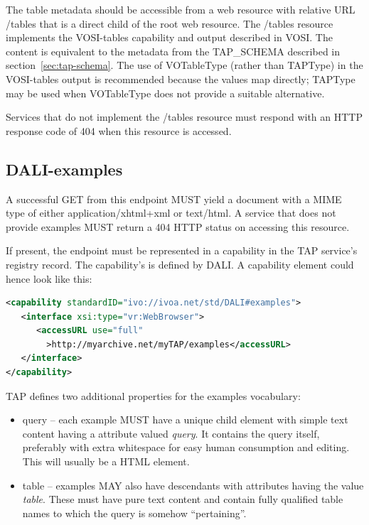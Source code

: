 \documentclass[11pt,letter]{ivoa}
\newcommand{\tapschema}{TAP\_SCHE\-MA}
\newcommand{\tapschema}{\mbox{%
  \relsize{-0.5}TAP\discretionary{-}{}{\kern-2pt\_}SCHEMA}}
\begin{document}
The table metadata should be accessible from a web resource with relative URL 
/tables that is a direct child of the root web resource. The /tables resource 
implements the VOSI-tables capability and output described in VOSI.
The content is equivalent to the metadata from the 
\tapschema{} described in section~\ref{sec:tap-schema}. The use of VOTableType 
(rather than TAPType) in the VOSI-tables output  is recommended because the values 
map directly; TAPType may be used when VOTableType does not provide a suitable
alternative.

Services that do not implement the /tables resource must respond with an HTTP 
response code of 404 when this resource is accessed.

\subsection{DALI-examples}
\label{sec:dali-examples}

A successful GET from this endpoint MUST yield a document with a MIME type of either 
application/xhtml+xml or text/html. A service that does not provide examples 
MUST return a 404 HTTP status on accessing this resource.

If present, the endpoint must be represented in a capability in the TAP 
service's registry record. The capability's  is defined by
DALI. A capability element could hence look like this:

\begin{lstlisting}[language=XML,basicstyle=\footnotesize]
<capability standardID="ivo://ivoa.net/std/DALI#examples">
   <interface xsi:type="vr:WebBrowser">
      <accessURL use="full"
        >http://myarchive.net/myTAP/examples</accessURL>
   </interface>
</capability>
\end{lstlisting}

TAP defines two additional properties for the examples vocabulary:

\begin{itemize}
\item query -- each example MUST have a unique child element with simple text 
content having a  attribute valued {\em query}. It contains the query itself, 
preferably with extra whitespace for easy human consumption and editing. This 
will usually be a HTML  element.
    
\item table -- examples MAY also have descendants with  attributes having 
the value {\em table}. These must have pure text content and contain fully qualified 
table names to which the query is somehow ``pertaining''.
\end{itemize}
\end{document}
